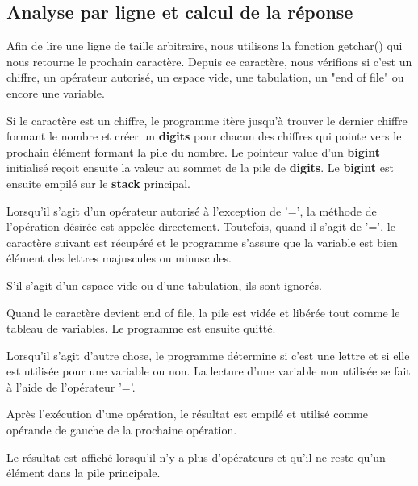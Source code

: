 \documentclass[]{report}
\begin{document}
	\begin{normalsize}
		\section*{\LARGE Analyse par ligne et calcul de la réponse}\vspace{4mm}
		Afin de lire une ligne de taille arbitraire, nous utilisons la fonction getchar() qui nous retourne le prochain caractère. Depuis ce caractère, nous vérifions si c'est un chiffre, un opérateur autorisé, un espace vide, une tabulation, un "end of file" ou encore une variable.\vspace{4mm}
		\par Si le caractère est un chiffre, le programme itère jusqu'à trouver le dernier chiffre formant le nombre et créer un \textbf{digits} pour chacun des chiffres qui pointe vers le prochain élément formant la pile du nombre. Le pointeur value d'un \textbf{bigint} initialisé reçoit ensuite la valeur au sommet de la pile de \textbf{digits}. Le \textbf{bigint} est ensuite empilé sur le \textbf{stack} principal.
		\vspace{4mm}
		\par Lorsqu'il s'agit d'un opérateur autorisé à l'exception de '=', la méthode de l'opération désirée est appelée directement. Toutefois, quand il s'agit de '=', le caractère suivant est récupéré et le programme s'assure que la variable est bien élément des lettres majuscules ou minuscules.
		\vspace{4mm}
		\par S'il s'agit d'un espace vide ou d'une tabulation, ils sont ignorés.\vspace{4mm}
		\par Quand le caractère devient end of file, la pile est vidée et libérée tout comme le tableau de variables. Le programme est ensuite quitté.\vspace{4mm}
		\par Lorsqu'il s'agit d'autre chose, le programme détermine si c'est une lettre et si elle est utilisée pour une variable ou non. La lecture d'une variable non utilisée se fait à l'aide de l'opérateur '='.\vspace{4mm}
		\par Après l'exécution d'une opération, le résultat est empilé et utilisé comme opérande de gauche de la prochaine opération.\vspace{4mm}
		\par Le résultat est affiché lorsqu'il n'y a plus d'opérateurs et qu'il ne reste qu'un élément dans la pile principale.
		\vspace{4mm}
	\end{normalsize}
\end{document}
